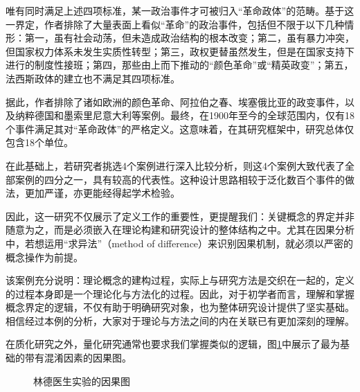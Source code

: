 唯有同时满足上述四项标准，某一政治事件才可被归入“革命政体”的范畴。基于这一界定，作者排除了大量表面上看似“革命”的政治事件，包括但不限于以下几种情形：第一，虽有社会动荡，但未造成政治结构的根本改变；第二，虽有暴力冲突，但国家权力体系未发生实质性转型；第三，政权更替虽然发生，但是在国家支持下进行的制度性接班；第四，那些由上而下推动的“颜色革命”或“精英政变”；第五，法西斯政体的建立也不满足其四项标准。

据此，作者排除了诸如欧洲的颜色革命、阿拉伯之春、埃塞俄比亚的政变事件，以及纳粹德国和墨索里尼意大利等案例。最终，在1900年至今的全球范围内，仅有18个事件满足其对“革命政体”的严格定义。这意味着，在其研究框架中，研究总体仅包含18个单位。

在此基础上，若研究者挑选4个案例进行深入比较分析，则这4个案例大致代表了全部案例的四分之一，具有较高的代表性。这种设计思路相较于泛化数百个事件的做法，更加严谨，亦更能经得起学术检验。

因此，这一研究不仅展示了定义工作的重要性，更提醒我们：关键概念的界定并非随意为之，而是必须嵌入在理论构建和研究设计的整体结构之中。尤其在因果分析中，若想运用“求异法”（method of difference）来识别因果机制，就必须以严密的概念操作为前提。

该案例充分说明：理论概念的建构过程，实际上与研究方法是交织在一起的，定义的过程本身即是一个理论化与方法化的过程。因此，对于初学者而言，理解和掌握概念界定的逻辑，不仅有助于明确研究对象，也为整体研究设计提供了坚实基础。相信经过本例的分析，大家对于理论与方法之间的内在关联已有更加深刻的理解。

在质化研究之外，量化研究通常也要求我们掌握类似的逻辑，图\ref{fig:lind}中展示了最为基础的带有混淆因素的因果图。

\begin{figure}[ht]
	\centering
	\caption{林德医生实验的因果图}
	\label{fig:lind}
\end{figure}

